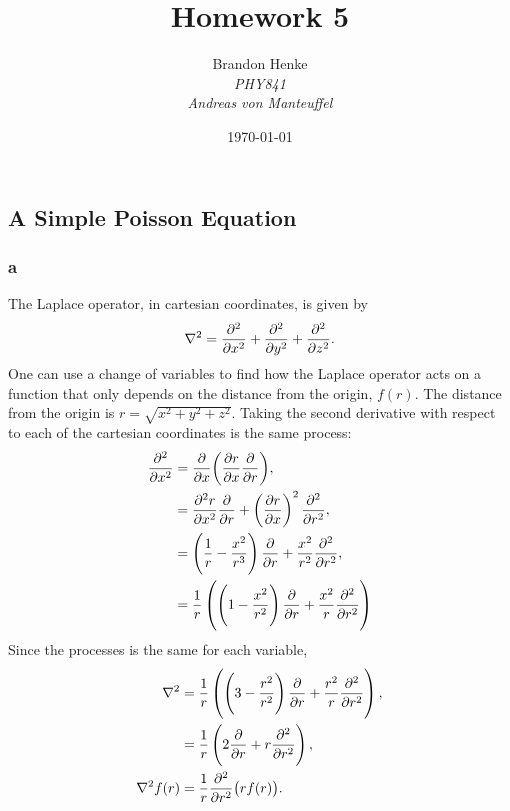 \documentclass{article}
\title{Homework 5}
\author{Brandon Henke\\\textit{PHY841}\\\textit{Andreas von Manteuffel}}
\date{\today}
\begin{document}
\maketitle
\begin{multicols*}{2}

	\subsection{A Simple Poisson Equation}
	\subsubsection*{a}
	The Laplace operator, in cartesian coordinates, is given by
	\[
		\laplacian{} = \pdv[2]{x}+\pdv[2]{y}+\pdv[2]{z}.
	\]
	One can use a change of variables to find how the Laplace operator acts on a function that only depends on the distance from the origin, $f(r)$.
	The distance from the origin is $r = \sqrt{x^2+y^2+z^2}$.
	Taking the second derivative with respect to each of the cartesian coordinates is the same process:
	\begin{align*}
		\pdv[2]{x}
		&= \pdv{x}(\pdv{r}{x}\pdv{r}),\\
		&= \pdv[2]{r}{x}\pdv{r}+\left(\pdv{r}{x}\right)^2\pdv[2]{r},\\
		&= \left(\frac{1}{r}-\frac{x^2}{r^3}\right)\pdv{r} + \frac{x^2}{r^2}\pdv[2]{r},\\
		&= \frac{1}{r} \left(\left(1-\frac{x^2}{r^2}\right)\pdv{r}+\frac{x^2}{r}\pdv[2]{r}\right)
	\end{align*}
	Since the processes is the same for each variable,
	\begin{align*}
		\laplacian
		&= \frac{1}{r} \left(\left(3-\frac{r^2}{r^2}\right)\pdv{r}+\frac{r^2}{r}\pdv[2]{r}\right),\\
		&= \frac{1}{r} \left(2\pdv{r}+r\pdv[2]{r}\right),\\
		\laplacian f(r)
		&= \frac{1}{r}\pdv[2]{r}(rf(r)).
	\end{align*}


\end{multicols*}
\end{document}
